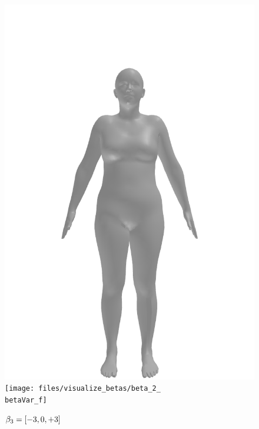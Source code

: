 \begin{figure}[ht!]
\begin{minipage}[b]{\textwidth}
        \includegraphics[width=\imgWidth]{files/visualize_betas/baseline_f}
        \texttt{[image: files/visualize\_betas/beta\_2\_\\betaVar\_f]}
        \caption[Effect of varying $\beta_3$ in SMPL]{$\beta_3 = [-3, 0, +3]$}
    \end{minipage}
\end{figure}

